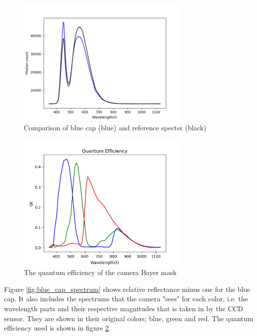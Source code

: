 \begin{figure}[h]
    \centering
    \includegraphics[width=0.75\textwidth]{Plots/blue_cap_original_spectrum_and_background.png}
    \caption{Comparison of blue cap (blue) and reference specter (black)}
    \label{fig:blue_cap_and_reference_spectrum}
\end{figure}

\begin{figure}[h]
    \centering
    \includegraphics[width=0.75\textwidth]{Plots/quantum_effiency.png}
    \caption{The quantum efficiency of the camera Bayer mask}
    \label{fig:quantum_efficiency_camera}
\end{figure}


Figure \ref{fig:blue_cap_spectrum} shows relative reflectance minus one for the blue cap. It also includes the spectrums that the camera "sees" for each color, i.e. the wavelength parts and their respective magnitudes that is taken in by the CCD sensor. They are shown in their original colors; blue, green and red. The quantum efficiency used is shown in figure \ref{fig:quantum_efficiency_camera}. 


